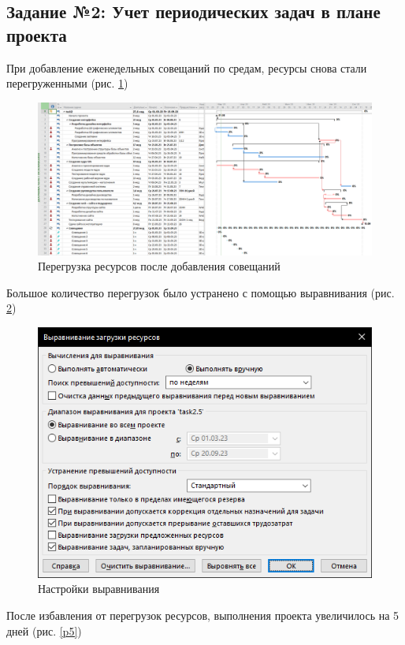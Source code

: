\newpage
\subsection*{Задание №2: Учет периодических задач в плане проекта}

При добавление еженедельных совещаний по средам, ресурсы снова стали перегруженными (рис. \ref{p3})

\begin{figure}[!h]
	\centering
	\includegraphics[width=1\linewidth]{inc/img/3.png}
	\caption{Перегрузка ресурсов после добавления совещаний}
	\label{p3}
\end{figure}

Большое количество перегрузок было устранено с помощью выравнивания (рис. \ref{p4})

\begin{figure}[!h]
	\centering
	\includegraphics[width=0.8\linewidth]{inc/img/4.png}
	\caption{Настройки выравнивания}
	\label{p4}
\end{figure}
\newpage
После избавления от перегрузок ресурсов, выполнения проекта увеличилось на 5 дней (рис. \ref{p5})

